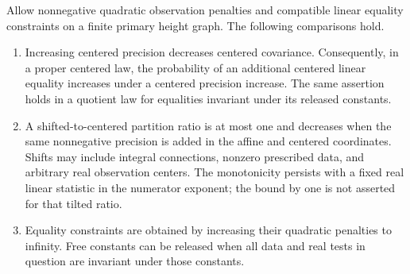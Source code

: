 \begin{lemma}
\label{heights:finite-comparisons}
Allow nonnegative quadratic observation penalties and compatible
linear equality constraints on a finite primary height graph.
The following comparisons hold.
\begin{enumerate}[label=\textup{(\roman*)}]
\item Increasing centered precision decreases centered covariance.
Consequently, in a proper centered law, the probability of an additional
centered linear equality increases under a centered precision increase.
The same assertion holds in a quotient law for equalities invariant
under its released constants.
\item A shifted-to-centered partition ratio is at most one and
decreases when the same nonnegative precision is added in the affine
and centered coordinates. Shifts may include integral connections,
nonzero prescribed data, and arbitrary real observation centers.
The monotonicity persists with a fixed real linear statistic in the
numerator exponent; the bound by one is not asserted for that
tilted ratio.
\item Equality constraints are obtained by increasing their quadratic
penalties to infinity. Free constants can be released when all data
and real tests in question are invariant under those constants.
\end{enumerate}
\end{lemma}

